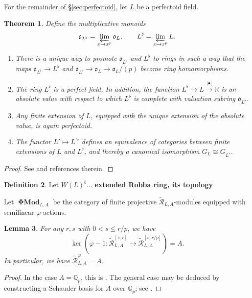 \documentclass[12pt]{amsart}
\newtheorem{theorem}{Theorem}[section]
\newtheorem{lemma}[theorem]{Lemma}
\theoremstyle{definition}
\newtheorem{defn}[theorem]{Definition}
\numberwithin{equation}{theorem}
\newcommand{\QQ}{\mathbb{Q}}
\newcommand{\RR}{\mathbb{R}}
\newcommand{\calR}{\mathcal{R}}
\newcommand{\frako}{\mathfrak{o}}
\DeclareMathOperator{\PhiMod}{\mathbf{\Phi Mod}}
\begin{document}
For the remainder of \S\ref{sec:perfectoid}, let $L$ be a perfectoid field.

\begin{theorem} \label{T:perfectoid}
Define the multiplicative monoids
\[
\frako_{L^{\flat}} = \varprojlim_{x \mapsto x^p} \frako_L, \qquad
L^{\flat} = \varprojlim_{x \mapsto x^p} L.
\]
\begin{enumerate}
\item[(a)]
There is a unique way to promote $\frako_{L^{\flat}}$ and $L^{\flat}$ to rings
in such a way that the maps $\frako_{L^{\flat}} \to L^{\flat}$ and $\frako_{L^{\flat}} \to \frako_L \to \frako_L/(p)$ become ring homomorphisms.
\item[(b)]
The ring $L^{\flat}$ is a perfect field. In addition,
the function $L^{\flat} \to L \stackrel{\left| \bullet \right|}{\to} \RR$ is an absolute value with respect to which $L^{\flat}$ is complete with valuation subring $\frako_{L^{\flat}}$.
\item[(c)]
Any finite extension of $L$, equipped with the unique extension of the absolute value, is again perfectoid.
\item[(d)]
The functor $L' \mapsto L^{\prime \flat}$ defines an equivalence of categories between finite extensions of $L$ and $L^{\flat}$, and thereby a canonical isomorphism $G_L \cong G_{L^{\flat}}$.
\end{enumerate}
\end{theorem}
\begin{proof}
See \cite[\S 1]{kedlaya-new-phigamma} and references therein.
\end{proof}

\begin{defn}
Let $W(L)^b$...
\textbf{extended Robba ring, its topology}

Let $\PhiMod_{L,A}$ be the category of finite projective $\tilde{\calR}_{L,A}$-modules equipped with semilinear $\varphi$-actions.
\end{defn}

\begin{lemma}
For any $r,s$ with $0 < s \leq r/p$, we have
\[
\ker(\varphi-1: \tilde{\calR}^{[s,r]}_{L,A} \to \tilde{\calR}^{[s,r/p]}_{L,A}) = A.
\]
In particular, we have $\tilde{\calR}_{L,A}^{\varphi} = A$.
\end{lemma}
\begin{proof}
In the case $A = \QQ_p$, this is \cite[Corollary~5.2.4]{kedlaya-liu1}. 
The general case may be deduced by constructing a Schauder basis for $A$ over $\QQ_p$; see \cite[Lemma~2.2.9(b)]{kedlaya-liu1}.
\end{proof}
\end{document}
